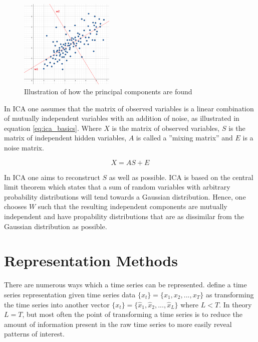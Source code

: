 \begin{figure}
    \begin{center}
    \includegraphics[width=0.4\textwidth]{tsc/pca_illustrated.png}
    \end{center}
    \caption{Illustration of how the principal components are found} 
    \label{fig:pca_illustrated}
\end{figure}

In ICA one assumes that the matrix of observed variables is a linear combination of mutually independent variables with an addition of noise, as illustrated in equation \ref{eq:ica_basics}. 
Where $X$ is the matrix of observed variables, $S$ is the matrix of independent hidden variables, $A$ is called a ''mixing matrix'' and $E$ is a noise matrix.  

\begin{equation}
    X = A S + E
    \label{eq:ica_basics}
\end{equation}

In ICA one aims to reconstruct $S$ as well as possible.
ICA is based on the central limit theorem which states that a sum of random variables with arbitrary probability distributions will tend towards a Gaussian distribution. 
Hence, one chooses $W$ such that the resulting independent components are mutually independent and have propability distributions that are as dissimilar from the Gaussian distribution as possible.

\section{Representation Methods} \label{sec:rep_methods}
There are numerous ways which a time series can be represented. 
\textcite{tsc_rev} define a time series representation given time series data $\{x_t\} = \{x_1, x_2, ... ,x_T\}$ as transforming the time series into another vector $\{x_t\} = \{\hat{x}_1, \hat{x}_2, ... ,\hat{x}_L\}$ where $L < T$. 
In theory $L=T$, but most often the point of transforming a time series is to reduce the amount of information present in the raw time series to more easily reveal patterns of interest. \bigskip

